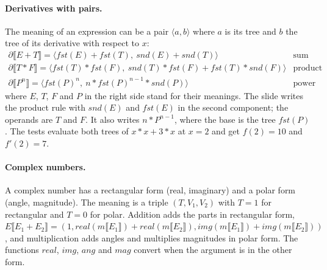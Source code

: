 \paragraph{Derivatives with pairs.} The meaning of an expression can be a pair
$\langle a, b \rangle$ where $a$ is its tree and $b$ the tree of its derivative with respect
to $x$:
\[
\begin{array}{ll}
\partial\llbracket E + T \rrbracket = \langle \mathit{fst}(E) + \mathit{fst}(T),\ \mathit{snd}(E) + \mathit{snd}(T) \rangle & \text{sum rule} \\
\partial\llbracket T * F \rrbracket = \langle \mathit{fst}(T) * \mathit{fst}(F),\ \mathit{snd}(T) * \mathit{fst}(F) + \mathit{fst}(T) * \mathit{snd}(F) \rangle & \text{product rule} \\
\partial\llbracket P^n \rrbracket = \langle \mathit{fst}(P)^n,\ n * \mathit{fst}(P)^{n-1} * \mathit{snd}(P) \rangle & \text{power rule}
\end{array}
\]
where $E$, $T$, $F$ and $P$ in the right side stand for their meanings. The slide
writes the product rule with $\mathit{snd}(E)$ and $\mathit{fst}(E)$ in the second
component; the operands are $T$ and $F$. It also writes $n * P^{n-1}$, where the
base is the tree $\mathit{fst}(P)$.
The tests evaluate both trees of $x * x + 3 * x$ at $x = 2$ and get $f(2) = 10$
and $f'(2) = 7$.

\paragraph{Complex numbers.} A complex number has a rectangular form (real,
imaginary) and a polar form (angle, magnitude). The meaning is a triple
$(T, V_1, V_2)$ with $T = 1$ for rectangular and $T = 0$ for polar.
Addition adds the parts in rectangular form,
$E\llbracket E_1 + E_2 \rrbracket = (1, \mathit{real}(m\llbracket E_1 \rrbracket) + \mathit{real}(m\llbracket E_2 \rrbracket), \mathit{img}(m\llbracket E_1 \rrbracket) + \mathit{img}(m\llbracket E_2 \rrbracket))$,
and multiplication adds angles and multiplies magnitudes in polar form. The
functions $\mathit{real}$, $\mathit{img}$, $\mathit{ang}$ and $\mathit{mag}$ convert when the
argument is in the other form.

